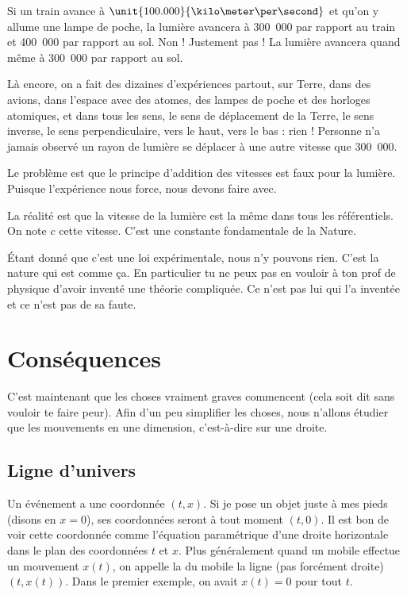 Si un train avance à \( \unit{100.000}{\kilo\meter\per\second}\) et qu'on y allume une lampe de poche, la lumière avancera à \unit{300.000}{\kilo\meter\per\second} par rapport au train et \unit{400.000}{\kilo\meter\per\second} par rapport au sol. Non ! Justement pas ! La lumière avancera quand même à \unit{300.000}{\kilo\meter\per\second} par rapport au sol.

Là encore, on a fait des dizaines d'expériences partout, sur Terre, dans des avions, dans l'espace avec des atomes, des lampes de poche et des horloges atomiques, et dans tous les sens, le sens de déplacement de la Terre, le sens inverse, le sens perpendiculaire, vers le haut, vers le bas : rien ! Personne n'a jamais observé un rayon de lumière se déplacer à une autre vitesse que \unit{300.000}{\kilo\meter\per\second}.

Le problème est que le principe d'addition des vitesses est faux pour la lumière. Puisque l'expérience nous force, nous devons faire avec.

\begin{loiphyz}		\label{LoiVitLum}
	La réalité est que la vitesse de la lumière est la même dans tous les référentiels. On note \( c\) cette vitesse. C'est une constante fondamentale de la Nature.
\end{loiphyz}
Étant donné que c'est une loi expérimentale, nous n'y pouvons rien. C'est la nature qui est comme ça. En particulier tu ne peux pas en vouloir à ton prof de physique d'avoir inventé une théorie compliquée. Ce n'est pas lui qui l'a inventée et ce n'est pas de sa faute.


\section{Conséquences}

C'est maintenant que les choses vraiment graves commencent (cela soit dit sans vouloir te faire peur). Afin d'un peu simplifier les choses, nous n'allons  étudier que les mouvements en une dimension, c'est-à-dire sur une droite.

\subsection{Ligne d'univers}

Un événement a une coordonnée \( (t,x)\). Si je pose un objet juste à mes pieds (disons en \( x=0\)), ses coordonnées seront à tout moment \( (t,0)\). Il est bon de voir cette coordonnée comme l'équation paramétrique d'une droite horizontale dans le plan des coordonnées \( t\) et \( x\). Plus généralement quand un mobile effectue un mouvement \( x(t)\), on appelle la  du mobile la ligne (pas forcément droite) \( (t,x(t))\). Dans le premier exemple, on avait \( x(t)=0\) pour tout \( t\).

